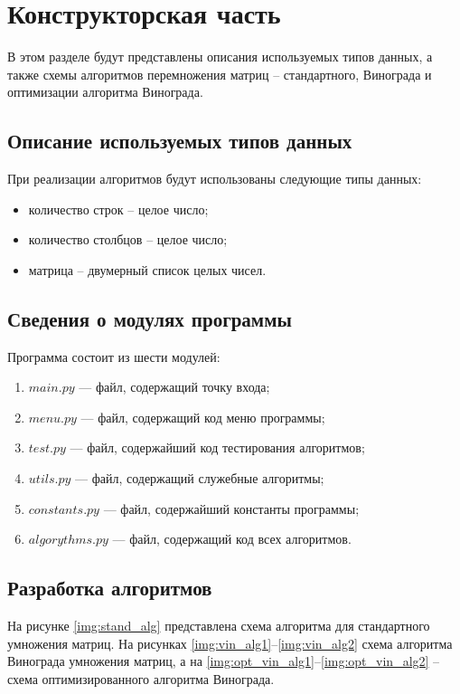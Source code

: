 \chapter{Конструкторская часть}
В этом разделе будут представлены описания используемых типов данных, а также схемы алгоритмов перемножения матриц -- стандартного, Винограда и оптимизации алгоритма Винограда.

\section{Описание используемых типов данных}

При реализации алгоритмов будут использованы следующие типы данных:
\begin{itemize}[label=---]
	\item количество строк -- целое число;
	\item количество столбцов -- целое число;
	\item матрица -- двумерный список целых чисел.
\end{itemize}


\section{Сведения о модулях программы}
Программа состоит из шести модулей:
\begin{enumerate}[label=\arabic*)]
	\item $main.py$ --- файл, содержащий точку входа;
    \item $menu.py$ --- файл, содержащий код меню программы;
    \item $test.py$ --- файл, содержайший код тестирования алгоритмов;
    \item $utils.py$ --- файл, содержащий служебные алгоритмы;
    \item $constants.py$ --- файл, содержайший константы программы;
    \item $algorythms.py$ --- файл, содержащий код всех алгоритмов. \newline
\end{enumerate}

\section{Разработка алгоритмов}
На рисунке \ref{img:stand_alg} представлена схема алгоритма для стандартного умножения матриц. На рисунках \ref{img:vin_alg1}--\ref{img:vin_alg2} схема алгоритма Винограда умножения матриц, а на \ref{img:opt_vin_alg1}--\ref{img:opt_vin_alg2} -- схема оптимизированного алгоритма Винограда.

